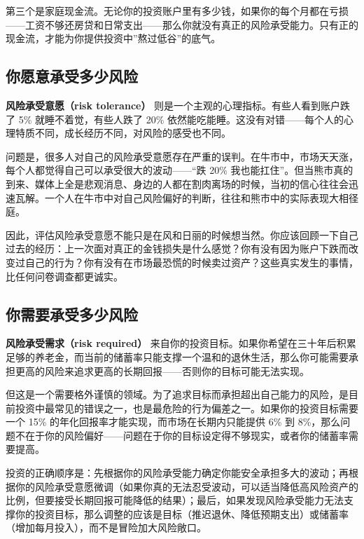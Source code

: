 \documentclass[a4paper,11pt,oneside,fontset=none,UTF8,zihao=-4]{ctexbook}
\begin{document}
第三个是家庭现金流。无论你的投资账户里有多少钱，如果你的每个月都在亏损------工资不够还房贷和日常支出------那么你就没有真正的风险承受能力。只有正的现金流，才能为你提供投资中''熬过低谷''的底气。

\subsection{你愿意承受多少风险}\label{ux4f60ux613fux610fux627fux53d7ux591aux5c11ux98ceux9669}

\textbf{风险承受意愿（risk tolerance）}
则是一个主观的心理指标。有些人看到账户跌了 5\% 就睡不着觉，有些人跌了
20\%
依然能吃能睡。这没有对错------每个人的心理特质不同，成长经历不同，对风险的感受也不同。

问题是，很多人对自己的风险承受意愿存在严重的误判。在牛市中，市场天天涨，每个人都觉得自己可以承受很大的波动------``跌
20\%
我也能扛住''。但当熊市真的到来、媒体上全是悲观消息、身边的人都在割肉离场的时候，当初的信心往往会迅速瓦解。一个人在牛市中对自己风险偏好的判断，往往和熊市中的实际表现大相径庭。

因此，评估风险承受意愿不能只是在风和日丽的时候想当然。你应该回顾一下自己过去的经历：上一次面对真正的金钱损失是什么感觉？你有没有因为账户下跌而改变过自己的行为？你有没有在市场最恐慌的时候卖过资产？这些真实发生的事情，比任何问卷调查都更诚实。

\subsection{你需要承受多少风险}\label{ux4f60ux9700ux8981ux627fux53d7ux591aux5c11ux98ceux9669}

\textbf{风险承受需求（risk required）}
来自你的投资目标。如果你希望在三十年后积累足够的养老金，而当前的储蓄率只能支撑一个温和的退休生活，那么你可能需要承担更高的风险来追求更高的长期回报------否则你的目标可能无法实现。

但这是一个需要格外谨慎的领域。为了追求目标而承担超出自己能力的风险，是目前投资中最常见的错误之一，也是最危险的行为偏差之一。如果你的投资目标需要一个
15\% 的年化回报率才能实现，而市场在长期内只能提供 6\% 到
8\%，那么问题不在于你的风险偏好------问题在于你的目标设定得不够现实，或者你的储蓄率需要提高。

投资的正确顺序是：先根据你的风险承受能力确定你能安全承担多大的波动；再根据你的风险承受意愿微调（如果你真的无法忍受波动，可以适当降低高风险资产的比例，但要接受长期回报可能降低的结果）；最后，如果发现风险承受能力无法支撑你的投资目标，那么调整的应该是目标（推迟退休、降低预期支出）或储蓄率（增加每月投入），而不是冒险加大风险敞口。
\end{document}
